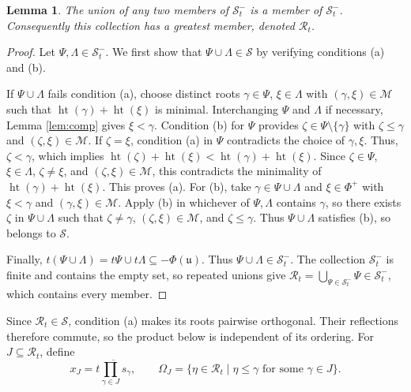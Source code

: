 \documentclass[12pt]{amsart}
\newtheorem{lemma}[theorem]{Lemma}
\theoremstyle{definition}
\numberwithin{equation}{section}
\begin{document}
\begin{lemma}\label{lem:am-negative-union}
The union of any two members of $\mathscr S_t^-$ is a member of
$\mathscr S_t^-$. Consequently this collection has a greatest member,
denoted $\mathscr{R}_t$.
\end{lemma}
\begin{proof}




Let $\Psi,\Lambda\in\mathscr S_t^-$. We first show that
$\Psi\cup\Lambda\in\mathscr S$ by verifying conditions (a) and (b).

If $\Psi\cup\Lambda$ fails condition (a), choose distinct roots $\gamma\in\Psi$,
$\xi\in\Lambda$ with $(\gamma,\xi)\in\mathscr M$ such that
$\operatorname{ht}(\gamma)+\operatorname{ht}(\xi)$ is minimal.
Interchanging $\Psi$ and $\Lambda$ if necessary,
Lemma \ref{lem:comp} gives $\xi<\gamma$. Condition (b) for $\Psi$
provides $\zeta\in\Psi\setminus\{\gamma\}$ with
$\zeta\leq\gamma$ and $(\zeta,\xi)\in\mathscr M$.
If $\zeta=\xi$, condition (a) in $\Psi$ contradicts the
choice of $\gamma,\xi$. Thus, $\zeta<\gamma$, which implies
$\operatorname{ht}(\zeta)+\operatorname{ht}(\xi)
<\operatorname{ht}(\gamma)+\operatorname{ht}(\xi)$.
Since $\zeta\in\Psi$, $\xi\in\Lambda$, $\zeta\ne\xi$, and
$(\zeta,\xi)\in\mathscr M$, this contradicts the minimality of
$\operatorname{ht}(\gamma)+\operatorname{ht}(\xi)$. This proves (a).
For (b), take $\gamma\in\Psi\cup\Lambda$ and
$\xi\in\Phi^+$ with $\xi<\gamma$ and $(\gamma,\xi)\in\mathscr M$.
Apply (b) in whichever of $\Psi,\Lambda$ contains $\gamma$, so there exists $\zeta$ in $\Psi\cup\Lambda$ such that $\zeta\neq \gamma$, $(\zeta,\xi)\in \mathscr{M}$, and $\zeta\leq \gamma$.
Thus $\Psi\cup\Lambda$ satisfies (b), so belongs to $\mathscr S$.

Finally, $t(\Psi\cup\Lambda)=t\Psi\cup t\Lambda\subseteq-\Phi(\mathfrak{u})$.
Thus $\Psi\cup\Lambda\in\mathscr S_t^-$.
The collection $\mathscr S_t^-$ is finite and contains the empty
set, so repeated unions give
$\mathscr{R}_t=\bigcup_{\Psi\in\mathscr S_t^-}\Psi\in\mathscr S_t^-$,
which contains every member.
\end{proof}

Since $\mathscr{R}_t\in\mathscr S$, condition (a) makes its roots
pairwise orthogonal. Their reflections therefore commute, so
the product below is independent of its ordering.
For $J\subseteq\mathscr{R}_t$, define
\begin{equation}\label{eq:am-column}
 x_J=\overline{t\prod_{\gamma\in J}s_\gamma},\qquad
 \Omega_J=\{\eta\in\mathscr{R}_t \mid \eta\leq\gamma
                         \text{ for some }\gamma\in J\}.
\end{equation}
\end{document}
